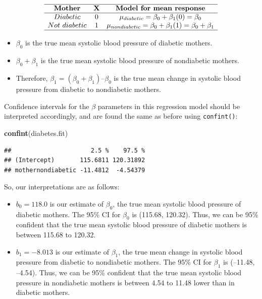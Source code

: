 \documentclass[
]{book}
\newenvironment{Shaded}{\begin{snugshade}}{\end{snugshade}}
\newcommand{\FunctionTok}[1]{\textcolor[rgb]{0.13,0.29,0.53}{\textbf{#1}}}
\newcommand{\NormalTok}[1]{#1}
\providecommand{\tightlist}{%
  \setlength{\itemsep}{0pt}\setlength{\parskip}{0pt}}
\begin{document}
\[\begin{array}{ccc}
\hline
\textbf{Mother} & \mathbf{X} & \textbf{Model for mean response} \\
\hline
Diabetic & 0 & \mu_{diabetic} =  \beta_0 + \beta_1(0) = \beta_0 \\
Not~diabetic & 1 & \mu_{nondiabetic} = \beta_0 + \beta_1(1) = \beta_0 + \beta_1 \\
\hline
\end{array}\]

\begin{itemize}
\tightlist
\item
  \(\beta_0\) is the true mean systolic blood pressure of diabetic mothers.
\item
  \(\beta_0 + \beta_1\) is the true mean systolic blood pressure of nondiabetic mothers.
\item
  Therefore, \(\beta_1 = (\beta_0 + \beta_1) – \beta_0\) is the true mean change in systolic blood pressure from diabetic to nondiabetic mothers.
\end{itemize}

Confidence intervals for the \(\beta\) parameters in this regression model should be interpreted accordingly, and are found the same as before using \texttt{confint()}:

\begin{Shaded}
\begin{Highlighting}[]
\FunctionTok{confint}\NormalTok{(diabetes.fit)}
\end{Highlighting}
\end{Shaded}

\begin{verbatim}
##                      2.5 %    97.5 %
## (Intercept)       115.6811 120.31892
## mothernondiabetic -11.4812  -4.54379
\end{verbatim}

So, our interpretations are as follows:

\begin{itemize}
\tightlist
\item
  \(b_0 = 118.0\) is our estimate of \(\beta_0\), the true mean systolic blood pressure of diabetic mothers. The 95\% CI for \(\beta_0\) is (115.68, 120.32). Thus, we can be 95\% confident that the true mean systolic blood pressure of diabetic mothers is between 115.68 to 120.32.
\item
  \(b_1 = -8.013\) is our estimate of \(\beta_1\), the true mean change in systolic blood pressure from diabetic to nondiabetic mothers. The 95\% CI for \(\beta_1\) is (--11.48, --4.54). Thus, we can be 95\% confident that the true mean systolic blood pressure in nondiabetic mothers is between 4.54 to 11.48 lower than in diabetic mothers.
\end{itemize}
\end{document}
